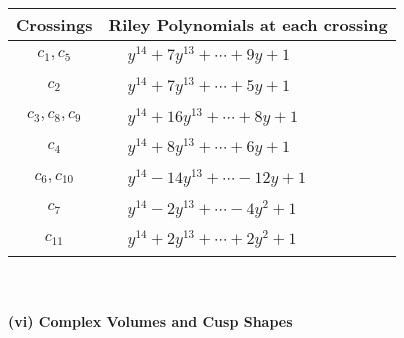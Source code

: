 \documentclass[1p]{elsarticle_modified}
\theoremstyle{definition}
\begin{document}
\begin{tabular}{m{50pt}|m{274pt}}
Crossings & \hspace{64pt}Riley Polynomials at each crossing \\
\hline $$\begin{aligned}c_{1},c_{5}\end{aligned}$$&$\begin{aligned}
&y^{14}+7 y^{13}+\cdots+9 y+1
\end{aligned}$\\
\hline $$\begin{aligned}c_{2}\end{aligned}$$&$\begin{aligned}
&y^{14}+7 y^{13}+\cdots+5 y+1
\end{aligned}$\\
\hline $$\begin{aligned}c_{3},c_{8},c_{9}\end{aligned}$$&$\begin{aligned}
&y^{14}+16 y^{13}+\cdots+8 y+1
\end{aligned}$\\
\hline $$\begin{aligned}c_{4}\end{aligned}$$&$\begin{aligned}
&y^{14}+8 y^{13}+\cdots+6 y+1
\end{aligned}$\\
\hline $$\begin{aligned}c_{6},c_{10}\end{aligned}$$&$\begin{aligned}
&y^{14}-14 y^{13}+\cdots-12 y+1
\end{aligned}$\\
\hline $$\begin{aligned}c_{7}\end{aligned}$$&$\begin{aligned}
&y^{14}-2 y^{13}+\cdots-4 y^2+1
\end{aligned}$\\
\hline $$\begin{aligned}c_{11}\end{aligned}$$&$\begin{aligned}
&y^{14}+2 y^{13}+\cdots+2 y^2+1
\end{aligned}$\\
\hline
\end{tabular}\\~\\
\newpage\flushleft \textbf{(vi) Complex Volumes and Cusp Shapes}
\end{document}
